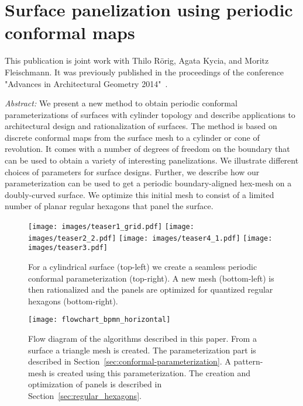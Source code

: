\documentclass[Thesis.tex]{subfiles}
\begin{document}
\chapter{Surface panelization using periodic conformal maps}
\label{chp:periodic_conformal_maps}

This publication is joint work with Thilo R\"orig, Agata Kycia, and 
Moritz Fleischmann. It was previously published in the proceedings of the conference "Advances in Architectural Geometry 2014"~\cite{Roerig2014}.

\emph{Abstract:} 
We present a new method to obtain periodic conformal parameterizations of
surfaces with cylinder topology and describe applications to
architectural design and rationalization of surfaces. The method is
based on discrete conformal maps from the surface mesh to a cylinder or
cone of revolution. It comes with a number of degrees of freedom on
the boundary that can be used to obtain a variety of interesting
panelizations. We illustrate different choices of parameters for
\nurbs surface designs. Further, we describe how our parameterization
can be used to get a periodic boundary-aligned hex-mesh on a
doubly-curved surface. We optimize this initial mesh to consist of a
limited number of planar regular hexagons that panel the surface.

\begin{figure}
  \centering
  \texttt{[image: images/teaser1\_grid.pdf]}
  \texttt{[image: images/teaser2\_2.pdf]}
  \texttt{[image: images/teaser4\_1.pdf]}
  \texttt{[image: images/teaser3.pdf]}
  \caption{For a cylindrical \nurbs surface (top-left) we create a
    seamless periodic conformal parameterization (top-right). A new
    mesh (bottom-left) is then rationalized and the panels are
    optimized for quantized regular hexagons (bottom-right).}
  \label{fig:teaser2}
\end{figure}

\def\subfilebibliography{}


\begin{figure}[tb]
\centering
\texttt{[image: flowchart\_bpmn\_horizontal]}
\caption{Flow diagram of the algorithms described in this paper. From
  a \nurbs surface a triangle mesh is created. The parameterization
  part is described in Section~\ref{sec:conformal-parameterization}. A
  pattern-mesh is created using this parameterization. The creation
  and optimization of panels is described in
  Section~\ref{sec:regular_hexagons}.}
\label{fig:algorithm_diagram}
\end{figure}
\end{document}
